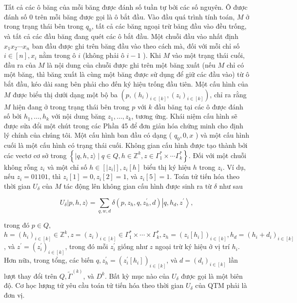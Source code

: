 \documentclass[10pt]{article}
\begin{document}
Tất cả các ô băng của mỗi băng được đánh số tuần tự bởi các số nguyên. Ô được đánh số 0 trên mỗi băng được gọi là ô bắt đầu. Vào đầu quá trình tính toán, $M$ ở trong trạng thái bên trong $q_{0}$, tất cả các băng ngoại trừ băng đầu vào đều trống, và tất cả các đầu băng đang quét các ô bắt đầu. Một chuỗi đầu vào nhất định $x_{1} x_{2} \cdots x_{n}$ ban đầu được ghi trên băng đầu vào theo cách mà, đối với mỗi chỉ số $i \in[n], x_{i}$ nằm trong ô $i$ (không phải ô $i-1$ ). Khi $M$ vào một trạng thái cuối, đầu ra của $M$ là nội dung của chuỗi được ghi trên một băng xuất (nếu $M$ chỉ có một băng, thì băng xuất là cùng một băng được sử dụng để giữ các đầu vào) từ ô bắt đầu, kéo dài sang bên phải cho đến ký hiệu trống đầu tiên. Một cấu hình của $M$ được biểu thị dưới dạng một bộ ba $\left(p,\left(h_{i}\right)_{i \in[k]},\left(z_{i}\right)_{i \in[k]}\right)$, chỉ ra rằng $M$ hiện đang ở trong trạng thái bên trong $p$ với $k$ đầu băng tại các ô được đánh số bởi $h_{1}, \ldots, h_{k}$ với nội dung băng $z_{1}, \ldots, z_{k}$, tương ứng. Khái niệm cấu hình sẽ được sửa đổi một chút trong các Phần 45 để đơn giản hóa chứng minh cho định lý chính của chúng tôi. Một cấu hình ban đầu có dạng ( $q_{0}, 0, x$ ) và một cấu hình cuối là một cấu hình có trạng thái cuối. Không gian cấu hình được tạo thành bởi các vectơ cơ sở trong $\left\{|q, h, z\rangle \mid q \in Q, h \in \mathbb{Z}^{k}, z \in \Gamma_{1}^{*} \times \cdots \Gamma_{k}^{*}\right\}$. Đối với một chuỗi không rỗng $z_{i}$ và một chỉ số $h \in\left[\left|z_{i}\right|\right], z_{i}[h]$ biểu thị ký hiệu $h$ trong $z_{i}$. Ví dụ, nếu $z_{i}=01101$, thì $z_{i}[1]=0, z_{i}[2]=1$, và $z_{i}[5]=1$. Toán tử tiến hóa theo thời gian $U_{\delta}$ của $M$ tác động lên không gian cấu hình được sinh ra từ $\delta$ như sau

$$
U_{\delta}|p, h, z\rangle=\sum_{q, w, d} \delta\left(p, z_{h}, q, z_{h}^{\prime}, d\right)\left|q, h_{d}, z^{\prime}\right\rangle,
$$

trong đó $p \in Q$, $h=\left(h_{i}\right)_{i \in[k]} \in \mathbb{Z}^{k}, z=\left(z_{i}\right)_{i \in[k]} \in \Gamma_{1}^{*} \times \cdots \times \Gamma_{k}^{*}, z_{h}=\left(z_{i}\left[h_{i}\right]\right)_{i \in[k]}, h_{d}=\left(h_{i}+d_{i}\right)_{i \in[k]}$, và $z^{\prime}=\left(z_{i}^{\prime}\right)_{i \in[k]}$, trong đó mỗi $z_{i}^{\prime}$ giống như $z$ ngoại trừ ký hiệu ở vị trí $h_{i}$. Hơn nữa, trong tổng, các biến $q, z_{h}^{\prime}=\left(z_{i}^{\prime}\left[h_{i}\right]\right)_{i \in[k]}$, và $d=\left(d_{i}\right)_{i \in[k]}$ lần lượt thay đổi trên $Q, \tilde{\Gamma}^{(k)}$, và $D^{k}$. Bất kỳ mục nào của $U_{\delta}$ được gọi là một biên độ. Cơ học lượng tử yêu cầu toán tử tiến hóa theo thời gian $U_{\delta}$ của QTM phải là đơn vị.
\end{document}
